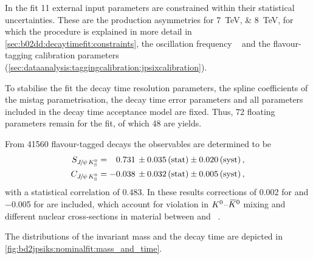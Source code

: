 In the fit 11 external input parameters are constrained within their
statistical uncertainties. These are the production asymmetries for
\SIlist{7;8}{\TeV}, for which the procedure is explained in more detail in
\cref{sec:b02dd:decaytimefit:constraints}, the oscillation frequency
\dmd~\cite{PDG2014} and the flavour-tagging calibration parameters
(\cref{sec:dataanalysis:taggingcalibration:jpsixcalibration}).

To stabilise the fit the decay time resolution parameters, the spline
coefficients of the mistag parametrisation, the decay time error parameters
and all parameters included in the decay time acceptance model are fixed.
Thus, \num{72} floating parameters remain for the fit, of which \num{48} are
yields.

From \num{41560} flavour-tagged \BdToJPsiKS decays the \CP observables are determined to be
\begin{align*}
  S_{{{J\mskip -3mu/\mskip -2mu\psi\mskip 2mu}}{{K}^0_{\mathrm{ \scriptscriptstyle S}}}} &=  \phantom{-}0.731 \, \pm 0.035 \, \text{(stat)} \pm 0.020 \, \text{(syst)}\,, \\
  C_{{{J\mskip -3mu/\mskip -2mu\psi\mskip 2mu}}{{K}^0_{\mathrm{ \scriptscriptstyle S}}}} &=  			- 0.038 \, \pm 0.032 \, \text{(stat)} \pm 0.005 \, \text{(syst)}\,,
\end{align*}
with a statistical correlation of \num{0.483}. In these results corrections of
\num{+0.002} for \SJpsiKS and \num{-0.005} for \CJpsiKS are included, which
account for \CP violation in ${{K}^0}$--${{\kern 0.2em\overline{\kern -0.2em K}{}}{}^0}$ mixing and different nuclear
cross-sections in material between \Kz and
\Kzb~\cite{Fetscher:1996fa,*Ko:2010mk}.

The distributions of the invariant mass and the decay time are depicted in
\cref{fig:bd2jpsiks:nominalfit:mass_and_time}.


